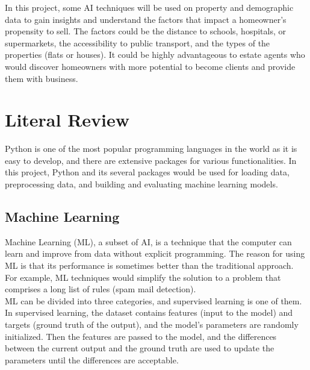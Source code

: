 \documentclass[12pt,twoside]{report}
\begin{document}
In this project, some AI techniques will be used on property and demographic data to gain insights and understand the factors that impact a homeowner's propensity to sell. The factors could be the distance to schools, hospitals, or supermarkets, the accessibility to public transport, and the types of the properties (flats or houses). It could be highly advantageous to estate agents who would discover homeowners with more potential to become clients and provide them with business. 

\chapter{Literal Review}
Python is one of the most popular programming languages in the world as it is easy to develop, and there are extensive packages for various functionalities. In this project, Python and its several packages would be used for loading data, preprocessing data, and building and evaluating machine learning models. 

\section{Machine Learning}
Machine Learning (ML), a subset of AI, is a technique that the computer can learn and improve from data without explicit programming. The reason for using ML is that its performance is sometimes better than the traditional approach. For example, ML techniques would simplify the solution to a problem that comprises a long list of rules (spam mail detection). 
\\

ML can be divided into three categories, and supervised learning is one of them. In supervised learning, the dataset contains features (input to the model) and targets (ground truth of the output), and the model's parameters are randomly initialized. Then the features are passed to the model, and the differences between the current output and the ground truth are used to update the parameters until the differences are acceptable. 
\\
\end{document}

